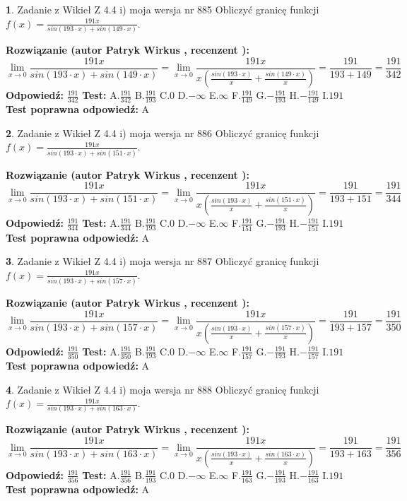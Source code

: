 \documentclass[12pt, a4paper]{article}
\theoremstyle{definition} %
\newtheorem{zad}{}
\newcommand{\zadStart}[1]{\begin{zad}#1\newline}
\newcommand{\zadStop}{\end{zad}}
\newcommand{\rozwStart}[2]{\noindent \textbf{Rozwiązanie (autor #1 , recenzent #2): }\newline}
\newcommand{\rozwStop}{\newline}
\newcommand{\odpStart}{\noindent \textbf{Odpowiedź:}\newline}
\newcommand{\odpStop}{\newline}
\newcommand{\testStart}{\noindent \textbf{Test:}\newline}
\newcommand{\testStop}{\newline}
\newcommand{\kluczStart}{\noindent \textbf{Test poprawna odpowiedź:}\newline}
\newcommand{\kluczStop}{\newline}
\begin{document}
\zadStart{Zadanie z Wikieł Z 4.4 i) moja wersja nr 885}
Obliczyć granicę funkcji $f(x)=\frac{191x}{sin(193\cdot x) +sin(149\cdot x)}$.
\zadStop
\rozwStart{Patryk Wirkus}{}
$$\lim\limits_{x\to 0}\frac{191x}{sin(193\cdot x) +sin(149\cdot x)}=\lim\limits_{x\to 0}\frac{191x}{x(\frac{sin(193\cdot x)}{x}+\frac{sin(149\cdot x)}{x})}=\frac{191}{193+149} = \frac{191}{342}$$
\rozwStop
\odpStart
$\frac{191}{342}$
\odpStop
\testStart
A.$\frac{191}{342}$
B.$\frac{191}{193}$
C.$0$
D.$-\infty$
E.$\infty$
F.$\frac{191}{149}$
G.$-\frac{191}{193}$
H.$-\frac{191}{149}$
I.$191$
\testStop
\kluczStart
A
\kluczStop



\zadStart{Zadanie z Wikieł Z 4.4 i) moja wersja nr 886}
Obliczyć granicę funkcji $f(x)=\frac{191x}{sin(193\cdot x) +sin(151\cdot x)}$.
\zadStop
\rozwStart{Patryk Wirkus}{}
$$\lim\limits_{x\to 0}\frac{191x}{sin(193\cdot x) +sin(151\cdot x)}=\lim\limits_{x\to 0}\frac{191x}{x(\frac{sin(193\cdot x)}{x}+\frac{sin(151\cdot x)}{x})}=\frac{191}{193+151} = \frac{191}{344}$$
\rozwStop
\odpStart
$\frac{191}{344}$
\odpStop
\testStart
A.$\frac{191}{344}$
B.$\frac{191}{193}$
C.$0$
D.$-\infty$
E.$\infty$
F.$\frac{191}{151}$
G.$-\frac{191}{193}$
H.$-\frac{191}{151}$
I.$191$
\testStop
\kluczStart
A
\kluczStop



\zadStart{Zadanie z Wikieł Z 4.4 i) moja wersja nr 887}
Obliczyć granicę funkcji $f(x)=\frac{191x}{sin(193\cdot x) +sin(157\cdot x)}$.
\zadStop
\rozwStart{Patryk Wirkus}{}
$$\lim\limits_{x\to 0}\frac{191x}{sin(193\cdot x) +sin(157\cdot x)}=\lim\limits_{x\to 0}\frac{191x}{x(\frac{sin(193\cdot x)}{x}+\frac{sin(157\cdot x)}{x})}=\frac{191}{193+157} = \frac{191}{350}$$
\rozwStop
\odpStart
$\frac{191}{350}$
\odpStop
\testStart
A.$\frac{191}{350}$
B.$\frac{191}{193}$
C.$0$
D.$-\infty$
E.$\infty$
F.$\frac{191}{157}$
G.$-\frac{191}{193}$
H.$-\frac{191}{157}$
I.$191$
\testStop
\kluczStart
A
\kluczStop



\zadStart{Zadanie z Wikieł Z 4.4 i) moja wersja nr 888}
Obliczyć granicę funkcji $f(x)=\frac{191x}{sin(193\cdot x) +sin(163\cdot x)}$.
\zadStop
\rozwStart{Patryk Wirkus}{}
$$\lim\limits_{x\to 0}\frac{191x}{sin(193\cdot x) +sin(163\cdot x)}=\lim\limits_{x\to 0}\frac{191x}{x(\frac{sin(193\cdot x)}{x}+\frac{sin(163\cdot x)}{x})}=\frac{191}{193+163} = \frac{191}{356}$$
\rozwStop
\odpStart
$\frac{191}{356}$
\odpStop
\testStart
A.$\frac{191}{356}$
B.$\frac{191}{193}$
C.$0$
D.$-\infty$
E.$\infty$
F.$\frac{191}{163}$
G.$-\frac{191}{193}$
H.$-\frac{191}{163}$
I.$191$
\testStop
\kluczStart
A
\kluczStop
\end{document}
